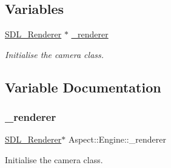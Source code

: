 \subsection*{Variables}
\begin{DoxyCompactItemize}
\item 
\mbox{\hyperlink{_s_d_l__render_8h_aaf0bf7d020754fc614fe06552ea4d5d4}{S\+D\+L\+\_\+\+Renderer}} $\ast$ \mbox{\hyperlink{namespace_aspect_1_1_engine_a2e77b2fdf7d09e5d3f7bd282fce342a2}{\+\_\+renderer}}
\begin{DoxyCompactList}\small\item\em Initialise the camera class. \end{DoxyCompactList}\end{DoxyCompactItemize}


\subsection{Variable Documentation}
\mbox{\label{namespace_aspect_1_1_engine_a2e77b2fdf7d09e5d3f7bd282fce342a2}} 
\subsubsection{\texorpdfstring{\+\_\+renderer}{\_renderer}}
{\footnotesize\ttfamily \mbox{\hyperlink{_s_d_l__render_8h_aaf0bf7d020754fc614fe06552ea4d5d4}{S\+D\+L\+\_\+\+Renderer}}$\ast$ Aspect\+::\+Engine\+::\+\_\+renderer}



Initialise the camera class. 

